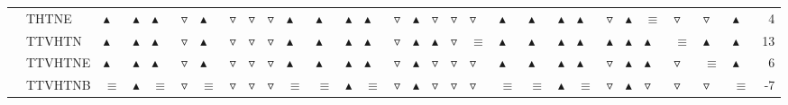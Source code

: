 \begin{table}
\begin{tabular}{lllllllllllllllllllllllllllllr}
       & THTNE &  $\blacktriangle$ &  $\blacktriangle$ &  $\blacktriangle$ &  $\triangledown$ &  $\blacktriangle$ &   $\triangledown$ &   $\triangledown$ &   $\triangledown$ &  $\blacktriangle$ &  $\blacktriangle$ &  $\blacktriangle$ &  $\blacktriangle$ &   $\triangledown$ &  $\blacktriangle$ &   $\triangledown$ &   $\triangledown$ &   $\triangledown$ &  $\blacktriangle$ &  $\blacktriangle$ &  $\blacktriangle$ &  $\blacktriangle$ &   $\triangledown$ &  $\blacktriangle$ &          $\equiv$ &   $\triangledown$ &   $\triangledown$ &  $\blacktriangle$ &        4 \\
       & TTVHTN &  $\blacktriangle$ &  $\blacktriangle$ &  $\blacktriangle$ &  $\triangledown$ &  $\blacktriangle$ &   $\triangledown$ &   $\triangledown$ &   $\triangledown$ &  $\blacktriangle$ &  $\blacktriangle$ &  $\blacktriangle$ &  $\blacktriangle$ &   $\triangledown$ &  $\blacktriangle$ &  $\blacktriangle$ &   $\triangledown$ &          $\equiv$ &  $\blacktriangle$ &  $\blacktriangle$ &  $\blacktriangle$ &  $\blacktriangle$ &  $\blacktriangle$ &  $\blacktriangle$ &  $\blacktriangle$ &          $\equiv$ &  $\blacktriangle$ &  $\blacktriangle$ &       13 \\
       & TTVHTNE &  $\blacktriangle$ &  $\blacktriangle$ &  $\blacktriangle$ &  $\triangledown$ &  $\blacktriangle$ &   $\triangledown$ &   $\triangledown$ &   $\triangledown$ &  $\blacktriangle$ &  $\blacktriangle$ &  $\blacktriangle$ &  $\blacktriangle$ &   $\triangledown$ &  $\blacktriangle$ &   $\triangledown$ &   $\triangledown$ &   $\triangledown$ &  $\blacktriangle$ &  $\blacktriangle$ &  $\blacktriangle$ &  $\blacktriangle$ &   $\triangledown$ &  $\blacktriangle$ &  $\blacktriangle$ &   $\triangledown$ &          $\equiv$ &  $\blacktriangle$ &        6 \\
       & TTVHTNB &          $\equiv$ &  $\blacktriangle$ &          $\equiv$ &  $\triangledown$ &          $\equiv$ &   $\triangledown$ &   $\triangledown$ &   $\triangledown$ &          $\equiv$ &          $\equiv$ &  $\blacktriangle$ &          $\equiv$ &   $\triangledown$ &  $\blacktriangle$ &   $\triangledown$ &   $\triangledown$ &   $\triangledown$ &          $\equiv$ &          $\equiv$ &  $\blacktriangle$ &          $\equiv$ &   $\triangledown$ &  $\blacktriangle$ &   $\triangledown$ &   $\triangledown$ &   $\triangledown$ &          $\equiv$ &       -7 \\
\bottomrule
\end{tabular}
\end{table}
